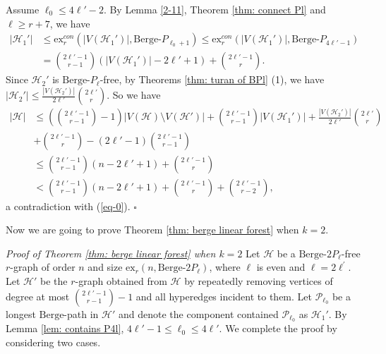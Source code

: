 \documentclass[12pt]{article}%
\newenvironment{proof}{{\noindent\it Proof.}}{\hfill $\square$\par}
\newcommand{\ber}{\text{Berge-}}
\newcommand{\mh}{\mathcal{H}}
\newcounter{cases}
\begin{document}
\begin{proof}
    Assume $\ell_0\leq 4\ell'-2$. By Lemma \ref{2-11}, Theorem \ref{thm: connect Pl} and $\ell\geq r+7$, we have\begin{equation*}
        \begin{aligned}
            |\mh_{1}'|&\leq \mathrm{ex}_r^{con}(|V(\mh_{1}')|,\ber P_{\ell_0+1})\leq \mathrm{ex}_r^{con}(|V(\mh_{1}')|,\ber P_{4\ell'-1})\\
            &= \binom{2\ell'-1}{r-1}(|V(\mh_{1}')|-2\ell'+1)+\binom{2\ell'-1}{r}.
        \end{aligned}
    \end{equation*}Since $\mh_{2}'$ is $\ber P_{\ell}$-free, by Theorems \ref{thm: turan of BPl} (1), we have
     $|\mh_{2}'|\leq  \frac{|V(\mh_{2}')|}{2\ell'}\binom{2\ell'}{r}.$
   So we have
    \begin{equation*}
        \begin{aligned}
            |\mh|&\leq \left(\binom{2\ell'-1}{r-1}-1\right)|V(\mh)\setminus V(\mh')|+\binom{2\ell'-1}{r-1}|V(\mh_{1}')|+\frac{|V(\mh_{2}')|}{2\ell'}\binom{2\ell'}{r} \\
            &+\binom{2\ell'-1}{r}-(2\ell'-1)\binom{2\ell'-1}{r-1}\\
            &\leq \binom{2\ell'-1}{r-1}(n-2\ell'+1)+\binom{2\ell'-1}{r}\\
            &< \binom{2\ell'-1}{r-1}(n-2\ell'+1)+\binom{2\ell'-1}{r}+\binom{2\ell'-1}{r-2},
        \end{aligned}
    \end{equation*}
   a contradiction with (\ref{eq-0}).
\end{proof}



Now we are going to prove  Theorem \ref{thm: berge linear forest} when $k=2$.


\noindent\emph{Proof of Theorem \ref{thm: berge linear forest} when $k=2$ } Let $\mathcal{H}$ be a $\ber 2P_\ell$-free $r$-graph of order $n$  and size $\mathrm{ex}_{r}(n,\ber 2P_{\ell})$, where $\ell$ is even and $\ell=2\ell^{'}$. Let $\mathcal{H}'$ be the $r$-graph  obtained from $\mathcal{H}$ by repeatedly removing vertices of degree at most $\binom{2\ell'-1}{r-1}-1$ and all hyperedges incident to them.
Let $\mathcal{P}_{\ell_0}$ be a longest $\ber$path in $\mh'$ and  denote the  component contained $\mathcal{P}_{\ell_0}$ as $\mh_{1}'$. By Lemma \ref{lem: contains P4l}, $4\ell'-1\leq\ell_0\leq 4\ell'$. We complete the proof by considering two cases.
\end{document}
